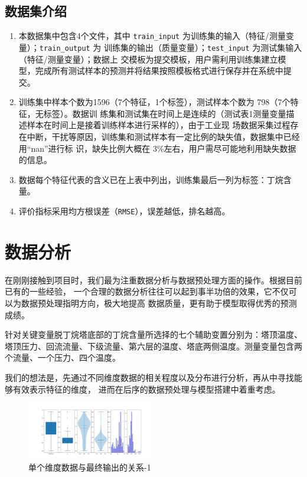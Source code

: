 \documentclass[11pt,a4paper]{elegantpaper}
\begin{document}
\begin{multicols}{2}
\subsection{数据集介绍}

\begin{enumerate}
  \item 本数据集中包含4个文件，其中 \lstinline{train_input} 为训练集的输入（特征/测量变量）；\lstinline{train_output} 为
  训练集的输出（质量变量）；\lstinline{test_input} 为测试集输入（特征/测量变量）；数据上
  交模板为提交模板，用户需利用训练集建立模型，完成所有测试样本的预测并将结果按照模板格式进行保存并在系统中提交。
  \item 训练集中样本个数为1596（7个特征，1个标签），测试样本个数为 798（7个特征，无标签）。数据训
  练集和测试集在时间上是连续的（测试表1测量变量描述样本在时间上是接着训练样本进行采样的），由于工业现
  场数据采集过程存在中断，干扰等原因，训练集和测试样本有一定比例的缺失值，数据集中已经用“nan”进行标
  识，缺失比例大概在 3\%左右，用户需尽可能地利用缺失数据的信息。
  \item 数据每个特征代表的含义已在上表中列出，训练集最后一列为标签：丁烷含量。
  \item 评价指标采用均方根误差（\lstinline{RMSE}），误差越低，排名越高。
\end{enumerate}

\section{数据分析}

在刚刚接触到项目时，我们最为注重数据分析与数据预处理方面的操作。根据目前已有的一些经验，
一个合理的数据分析往往可以起到事半功倍的效果，它不仅可以为数据预处理指明方向，极大地提高
数据质量，更有助于模型取得优秀的预测成绩。

针对关键变量脱丁烷塔底部的丁烷含量所选择的七个辅助变置分别为：塔顶温度、塔顶压力、回流流量、下级流量、第六层的温度、塔底两侧温度。测量变量包含两个流量、一个压力、四个温度。

我们的想法是，先通过不同维度数据的相关程度以及分布进行分析，再从中寻找能够有效表示特征的维度，
进而在后序的数据预处理与模型搭建中着重考虑。

\begin{figure}[H]
  \centering
  \includegraphics[width=0.5\textwidth]{images/single_feature.png}
  \caption{单个维度数据与最终输出的关系-1} 
\end{figure}


\end{multicols}
\end{document}

